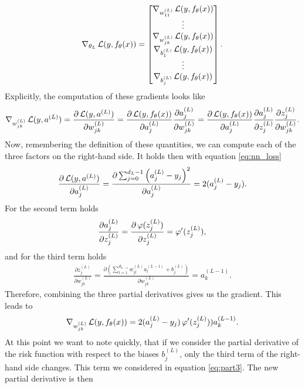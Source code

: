 \begin{align*}
\nabla_{\theta_{L}} \operatorname{\mathcal{L}}(y, f_{\theta}(x)) = \left[\begin{matrix}
\nabla_{w^{(L)}_{11}} \operatorname{\mathcal{L}}(y, f_{\theta}(x))\\
\vdots\\
\nabla_{w^{(L)}_{jk}} \operatorname{\mathcal{L}}(y, f_{\theta}(x))\\
\nabla_{b^{(L)}_{1}} \operatorname{\mathcal{L}}(y, f_{\theta}(x))\\
\vdots\\
\nabla_{b^{(L)}_{j}} \operatorname{\mathcal{L}}(y, f_{\theta}(x))
\end{matrix} \right].
\end{align*}
Explicitly, the computation of these gradients looks like
\begin{align*}
\nabla_{w^{(L)}_{jk}} \operatorname{\mathcal{L}}(y, a^{(L)}) = \frac{\partial \operatorname{\mathcal{L}}(y, a^{(L)})}{\partial w^{(L)}_{jk}} = \frac{\partial \operatorname{\mathcal{L}}(y, f_{\theta}(x))}{\partial a_{j}^{(L)}} \frac{\partial a_{j}^{(L)}}{\partial w^{(L)}_{jk}} = \frac{\partial \operatorname{\mathcal{L}}(y, f_{\theta}(x))}{\partial a_{j}^{(L)}} \frac{\partial a_{j}^{(L)}}{\partial z_{j}^{(L)}} \frac{\partial z_{j}^{(L)}}{\partial w^{(L)}_{jk}}.
\end{align*}
Now, remembering the definition of these quantities, we can compute each of the three factors on the right-hand side. It holds then with equation \eqref{eq:nn_loss}
\begin{align}\label{eq:part1}
\frac{\partial \operatorname{\mathcal{L}}(y, a^{(L)})}{\partial a_{j}^{(L)}} = \frac{\partial \sum_{j=0}^{d_L-1} \left(a_{j}^{(L)} - y_j \right)^2}{\partial a_{j}^{(L)}} = 2(a_{j}^{(L)} - y_j).
\end{align}
For the second term holds
\begin{align}\label{eq:part2}
\frac{\partial a_{j}^{(L)}}{\partial z_{j}^{(L)}} = \frac{\partial \operatorname{\varphi}(z_{j}^{(L)})}{\partial z_{j}^{(L)}} = \operatorname{\varphi}^{\prime} (z_{j}^{(L)}),
\end{align}
and for the third term holds
\begin{align}\label{eq:part3}
\frac{\partial z_{j}^{(L)}}{\partial w^{(L)}_{jk}} = \frac{\partial \left(\sum_{l=1}^{d_{L-1}} w^{(L)}_{jl} a_{l}^{(L-1)} + b_j^{(L)}\right)}{\partial w^{(L)}_{jk}} = a_{k}^{(L-1)}.
\end{align}
Therefore, combining the three partial derivatives gives us the gradient. This leads to
\begin{align*}
\nabla_{w^{(L)}_{jk}} \operatorname{\mathcal{L}}(y, f_{\theta}(x)) = 2(a_{j}^{(L)} - y_j) \operatorname{\varphi}^{\prime} (z_{j}^{(L)})) a_{k}^{(L-1)}.
\end{align*}
At this point we want to note quickly, that if we consider the partial derivative of the risk function with respect to the biases $b_{j}^{(L)}$, only the third term of the right-hand side changes. This term we considered in equation \eqref{eq:part3}. The new partial derivative is then
